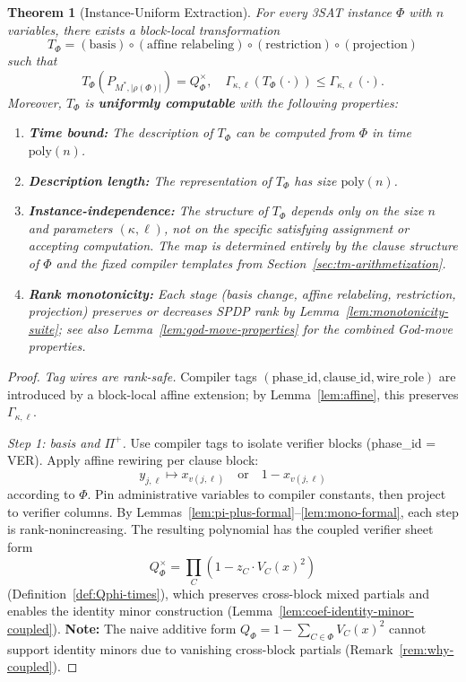 \documentclass[12pt]{article}
\newtheorem{theorem}{Theorem}
\theoremstyle{definition}
\theoremstyle{definition}
\theoremstyle{remark}
\theoremstyle{remark}
\begin{document}
\begin{theorem}[Instance-Uniform Extraction]\label{thm:tphi-formal}
For every 3SAT instance $\Phi$ with $n$ variables,
there exists a block-local transformation
\[
T_\Phi = (\text{basis}) \circ (\text{affine relabeling}) \circ (\text{restriction}) \circ (\text{projection})
\]
such that
\[
T_\Phi(P_{M^*,|\rho(\Phi)|}) = Q^{\times}_\Phi,
\quad
\Gamma_{\kappa,\ell}(T_\Phi(\cdot)) \leq \Gamma_{\kappa,\ell}(\cdot).
\]
Moreover, $T_\Phi$ is \textbf{uniformly computable} with the following properties:
\begin{enumerate}[label=(\roman*)]
\item \textbf{Time bound:} The description of $T_\Phi$ can be computed from $\Phi$ in time $\mathrm{poly}(n)$.
\item \textbf{Description length:} The representation of $T_\Phi$ has size $\mathrm{poly}(n)$.
\item \textbf{Instance-independence:} The structure of $T_\Phi$ depends only on the size $n$ and parameters $(\kappa,\ell)$, not on the specific satisfying assignment or accepting computation. The map is determined entirely by the clause structure of $\Phi$ and the fixed compiler templates from Section~\ref{sec:tm-arithmetization}.
\item \textbf{Rank monotonicity:} Each stage (basis change, affine relabeling, restriction, projection) preserves or decreases SPDP rank by Lemma~\ref{lem:monotonicity-suite}; see also Lemma~\ref{lem:god-move-properties} for the combined God-move properties.
\end{enumerate}
\end{theorem}

\begin{proof}
\emph{Tag wires are rank-safe.}
Compiler tags $(\mathrm{phase\_id},\mathrm{clause\_id},\mathrm{wire\_role})$ are introduced by a
block-local affine extension; by Lemma~\ref{lem:affine}, this preserves $\Gamma_{\kappa,\ell}$.

\emph{Step 1: basis and $\Pi^+$.}
Use compiler tags to isolate verifier blocks
(phase\_id = VER).
Apply affine rewiring per clause block:
\[
y_{j,\ell} \mapsto x_{v(j,\ell)} \quad\text{or}\quad 1 - x_{v(j,\ell)}
\]
according to $\Phi$.
Pin administrative variables to compiler constants,
then project to verifier columns.
By Lemmas~\ref{lem:pi-plus-formal}--\ref{lem:mono-formal},
each step is rank-nonincreasing.
The resulting polynomial has the coupled verifier sheet form
\[
Q^{\times}_\Phi = \prod_C (1 - z_C \cdot V_C(x)^2)
\]
(Definition~\ref{def:Qphi-times}), which preserves cross-block mixed partials and enables the identity minor construction (Lemma~\ref{lem:coef-identity-minor-coupled}).
\textbf{Note:} The naive additive form $Q_\Phi = 1 - \sum_{C \in \Phi} V_C(x)^2$ cannot support identity minors due to vanishing cross-block partials (Remark~\ref{rem:why-coupled}).
\end{proof}
\end{document}
